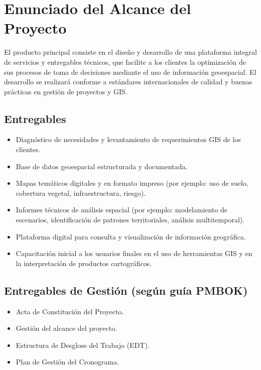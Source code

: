 \section{Enunciado del Alcance del Proyecto}

El producto principal consiste en el diseño y desarrollo de una plataforma integral de servicios y entregables técnicos, que facilite a los clientes la optimización de sus procesos de toma de decisiones mediante el uso de información geoespacial. El desarrollo se realizará conforme a estándares internacionales de calidad y buenas prácticas en gestión de proyectos y GIS.

\subsection{Entregables}

\begin{itemize}
  \item Diagnóstico de necesidades y levantamiento de requerimientos GIS de los clientes.
  \item Base de datos geoespacial estructurada y documentada.
  \item Mapas temáticos digitales y en formato impreso (por ejemplo: uso de suelo, cobertura vegetal, infraestructura, riesgo).
  \item Informes técnicos de análisis espacial (por ejemplo: modelamiento de escenarios, identificación de patrones territoriales, análisis multitemporal).
  \item Plataforma digital para consulta y visualización de información geográfica.
  \item Capacitación inicial a los usuarios finales en el uso de herramientas GIS y en la interpretación de productos cartográficos.
\end{itemize}

\subsection{Entregables de Gestión (según guía PMBOK)}

\begin{itemize}
  \item Acta de Constitución del Proyecto.
  \item Gestión del alcance del proyecto.
  \item Estructura de Desglose del Trabajo (EDT).
  \item Plan de Gestión del Cronograma.
\end{itemize}

